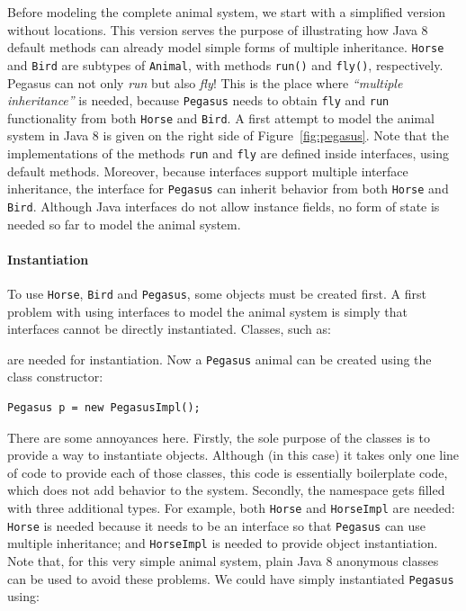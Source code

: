 Before modeling the complete animal system, we  start with a
simplified version without locations. This version serves the purpose of illustrating how
Java 8 default methods can already model simple forms of multiple inheritance.
\texttt{Horse} and \texttt{Bird} are subtypes
of \texttt{Animal}, with methods \texttt{run()} and \texttt{fly()},
respectively. Pegasus can not only \emph{run} but also \emph{fly}! This is the
place where \emph{``multiple inheritance''} is needed, because
\texttt{Pegasus} needs to obtain \texttt{fly} and \texttt{run}
functionality from both \texttt{Horse} and \texttt{Bird}.
A first attempt to model the animal system in Java 8 is given on the right side
of Figure~\ref{fig:pegasus}.
Note that the implementations of the methods \texttt{run}
and \texttt{fly} are defined inside interfaces, using default
methods. Moreover, because interfaces support multiple interface
inheritance, the interface for \texttt{Pegasus} can inherit behavior
from both \texttt{Horse} and \texttt{Bird}. Although Java interfaces
do not allow instance fields, no form of state is needed so far to
model the animal system.

\paragraph{Instantiation}
To use \texttt{Horse}, \texttt{Bird} and \texttt{Pegasus}, some
objects must be created first. A first problem with using
interfaces to model the animal system is simply that interfaces
cannot be directly instantiated. Classes, such as:


\noindent are needed for instantiation. Now a \texttt{Pegasus} animal can be created
using the class constructor:

\begin{lstlisting}
Pegasus p = new PegasusImpl();
\end{lstlisting}

\noindent There are some annoyances here. Firstly, the sole
purpose of the classes is to provide a way to instantiate
objects. Although (in this case) it takes only one line of code to
provide each of those classes, this code is essentially boilerplate
code, which does not add behavior to the system. Secondly,
the namespace gets filled with three additional types. For example,
both \texttt{Horse} and \texttt{HorseImpl} are needed: \texttt{Horse}
is needed because it needs to be an interface so that \texttt{Pegasus}
can use multiple inheritance; and \texttt{HorseImpl} is needed to
provide object instantiation.
Note that, for this very simple animal system, plain Java 8 anonymous
classes can be used to avoid these problems.  We could have simply
instantiated \texttt{Pegasus} using:

